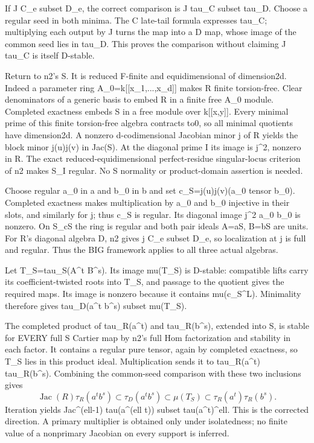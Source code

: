 \documentclass[11pt]{article}
\begin{document}
If J C\_e subset D\_e, the correct comparison is J tau\_C subset tau\_D. Choose a regular seed in both minima. The C late-tail formula expresses tau\_C; multiplying each output by J turns the map into a D map, whose image of the common seed lies in tau\_D. This proves the comparison without claiming J tau\_C is itself D-stable.

Return to n2's S. It is reduced F-finite and equidimensional of dimension2d. Indeed a parameter ring A\_0=k[[x\_1,...,x\_d]] makes R finite torsion-free. Clear denominators of a generic basis to embed R in a finite free A\_0 module. Completed exactness embeds S in a free module over k[[x,y]]. Every minimal prime of this finite torsion-free algebra contracts to0, so all minimal quotients have dimension2d. A nonzero d-codimensional Jacobian minor j of R yields the block minor j(u)j(v) in Jac(S). At the diagonal prime I its image is j\textasciicircum{}2, nonzero in R. The exact reduced-equidimensional perfect-residue singular-locus criterion of n2 makes S\_I regular. No S normality or product-domain assertion is needed.

Choose regular a\_0 in a and b\_0 in b and set c\_S=j(u)j(v)(a\_0 tensor b\_0). Completed exactness makes multiplication by a\_0 and b\_0 injective in their slots, and similarly for j; thus c\_S is regular. Its diagonal image j\textasciicircum{}2 a\_0 b\_0 is nonzero. On S\_cS the ring is regular and both pair ideals A=aS, B=bS are units. For R's diagonal algebra D, n2 gives j C\_e subset D\_e, so localization at j is full and regular. Thus the BIG framework applies to all three actual algebras.

Let T\_S=tau\_S(A\textasciicircum{}t B\textasciicircum{}s). Its image mu(T\_S) is D-stable: compatible lifts carry its coefficient-twisted roots into T\_S, and passage to the quotient gives the required maps. Its image is nonzero because it contains mu(c\_S\textasciicircum{}L). Minimality therefore gives tau\_D(a\textasciicircum{}t b\textasciicircum{}s) subset mu(T\_S).

The completed product of tau\_R(a\textasciicircum{}t) and tau\_R(b\textasciicircum{}s), extended into S, is stable for EVERY full S Cartier map by n2's full Hom factorization and stability in each factor. It contains a regular pure tensor, again by completed exactness, so T\_S lies in this product ideal. Multiplication sends it to tau\_R(a\textasciicircum{}t) tau\_R(b\textasciicircum{}s). Combining the common-seed comparison with these two inclusions gives
\[
\operatorname{Jac}(R)\tau_R(a^t b^s)
\subset\tau_D(a^t b^s)
\subset\mu(T_S)
\subset\tau_R(a^t)\tau_R(b^s).
\]
Iteration yields Jac\textasciicircum{}(ell-1) tau(a\textasciicircum{}(ell t)) subset tau(a\textasciicircum{}t)\textasciicircum{}ell. This is the corrected direction. A primary multiplier is obtained only under isolatedness; no finite value of a nonprimary Jacobian on every support is inferred.
\end{document}
